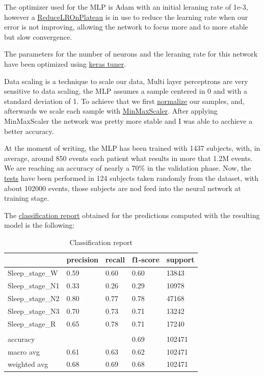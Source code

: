 The optimizer used for the MLP is Adam with an initial leraning rate of 1e-3, however a \href{https://keras.io/api/callbacks/reduce_lr_on_plateau/}{ReduceLROnPlateau} is in use to reduce the learning rate when our error is not improving, allowing the network to focus more and to more stable but slow convergence.

The parameters for the number of neurons and the leraning rate for this network have been optimized using \href{https://keras.io/keras_tuner/}{keras tuner}.

Data scaling is a technique to scale our data, Multi layer perceptrons are very sensitive to data scaling, the MLP assumes a sample centered in 0 and with a standard deviation of 1. To achieve that we first \href{https://github.com/szz-dvl/soundless/blob/main/modules/edf.py#L157}{normalize} our samples, and, afterwards we scale each sample with \href{https://scikit-learn.org/stable/modules/generated/sklearn.preprocessing.MinMaxScaler.html}{MinMaxScaler}. After applying MinMaxScaler the network was pretty more stable and I was able to acchieve a better accuracy.

At the moment of writing, the MLP has been trained with 1437 subjects, with, in average, around 850 events each patient what results in more that 1.2M events. We are reaching an accuracy of nearly a 70\% in the validation phase. Now, the \href{https://github.com/szz-dvl/soundless/blob/main/mlp_test.py}{tests} have been performed in 124 subjects taken randomly from the dataset, with about 102000 events, those subjects are nod feed into the neural network at training stage.

The \href{https://scikit-learn.org/stable/modules/generated/sklearn.metrics.classification_report.html}{classification report} obtained for the predictions computed with the resulting model is the following:

\begin{table}[H]
\begin{center}
\begin{tabular}{ |p{3cm}||p{2cm}||p{2cm}||p{2cm}||p{2cm}| }
 \hline
 & precision & recall & f1-score & support\\
 \hline  
 Sleep\_stage\_W & 0.59 & 0.60 & 0.60 & 13843 \\
 Sleep\_stage\_N1 & 0.33 & 0.26 & 0.29 & 10978 \\
 Sleep\_stage\_N2 & 0.80 & 0.77 & 0.78 & 47168 \\
 Sleep\_stage\_N3 & 0.70 & 0.73 & 0.71 & 13242 \\
 Sleep\_stage\_R & 0.65 & 0.78 & 0.71 & 17240 \\
 & & & & \\
 accuracy &  &  & 0.69 & 102471 \\
 macro avg & 0.61 & 0.63 & 0.62 & 102471 \\
 weighted avg & 0.68 & 0.69 & 0.68 & 102471 \\
 \hline
\end{tabular}
\end{center}
\caption{Classification report}
\label{tab4}
\end{table}

